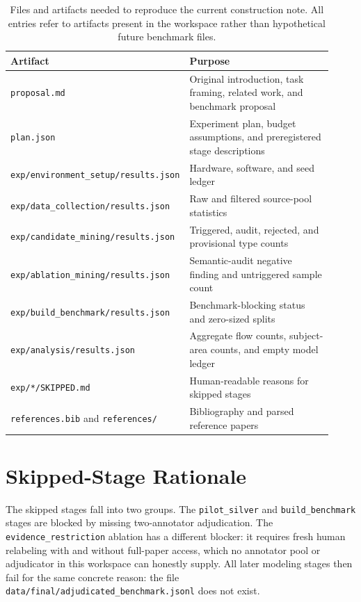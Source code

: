 \documentclass{article}
\begin{document}
\begin{table}[t]
\caption{Files and artifacts needed to reproduce the current construction note. All entries refer to artifacts present in the workspace rather than hypothetical future benchmark files.}
\label{tab:inventory}
\centering
\small
\begin{tabular}{p{0.42\linewidth}p{0.50\linewidth}}
\toprule
Artifact & Purpose \\
\midrule
\texttt{proposal.md} & Original introduction, task framing, related work, and benchmark proposal \\
\texttt{plan.json} & Experiment plan, budget assumptions, and preregistered stage descriptions \\
\texttt{exp/environment\_setup/results.json} & Hardware, software, and seed ledger \\
\texttt{exp/data\_collection/results.json} & Raw and filtered source-pool statistics \\
\texttt{exp/candidate\_mining/results.json} & Triggered, audit, rejected, and provisional type counts \\
\texttt{exp/ablation\_mining/results.json} & Semantic-audit negative finding and untriggered sample count \\
\texttt{exp/build\_benchmark/results.json} & Benchmark-blocking status and zero-sized splits \\
\texttt{exp/analysis/results.json} & Aggregate flow counts, subject-area counts, and empty model ledger \\
\texttt{exp/*/SKIPPED.md} & Human-readable reasons for skipped stages \\
\texttt{references.bib} and \texttt{references/} & Bibliography and parsed reference papers \\
\bottomrule
\end{tabular}
\end{table}

\section{Skipped-Stage Rationale}
\label{app:skipped}

The skipped stages fall into two groups. The \texttt{pilot\_silver} and \texttt{build\_benchmark} stages are blocked by missing two-annotator adjudication. The \texttt{evidence\_restriction} ablation has a different blocker: it requires fresh human relabeling with and without full-paper access, which no annotator pool or adjudicator in this workspace can honestly supply. All later modeling stages then fail for the same concrete reason: the file \texttt{data/final/adjudicated\_benchmark.jsonl} does not exist.
\end{document}
